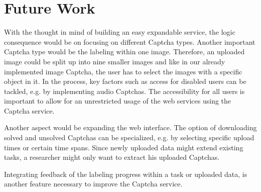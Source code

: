 \section{Future Work}
\label{sec:future_work}

With the thought in mind of building an easy expandable service, the logic consequence would be on focusing on different Captcha types. Another important Captcha type would be the labeling within one image. Therefore, an uploaded image could be split up into nine smaller images and like in our already implemented image Captcha, the user has to select the images with a specific object in it. In the process, key factors such as access for disabled users can be tackled, e.g. by implementing audio Captchas. The accessibility for all users is important to allow for an unrestricted usage of the web services using the Captcha service.

Another aspect would be expanding the web interface. The option of downloading solved and unsolved Captchas can be specialized, e.g. by selecting specific upload times or certain time spans. Since newly uploaded data might extend existing tasks, a researcher might only want to extract his uploaded Captchas.

Integrating feedback of the labeling progress within a task or uploaded data, is another feature necessary to improve the Captcha service.

\clearpage
